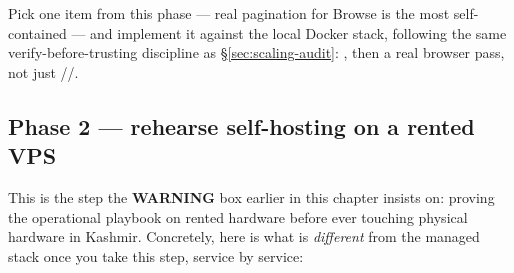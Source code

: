 \begin{olktask}
Pick one item from this phase — real pagination for Browse is the most self-contained — and implement it against the local Docker stack, following the same verify-before-trusting discipline as \S\ref{sec:scaling-audit}: , then a real browser pass, not just //.
\end{olktask}

\subsection{Phase 2 --- rehearse self-hosting on a rented VPS}

This is the step the \textbf{WARNING} box earlier in this chapter insists on: proving the operational playbook on rented hardware before ever touching physical hardware in Kashmir. Concretely, here is what is \emph{different} from the managed stack once you take this step, service by service:

